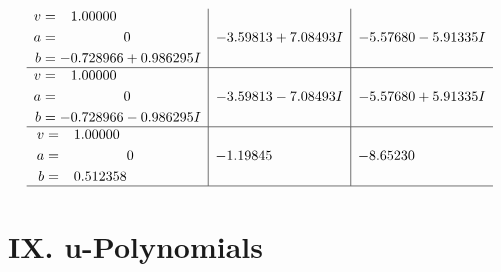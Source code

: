 \documentclass[1p]{elsarticle_modified}
\theoremstyle{definition}
\begin{document}
$$\begin{array}{c|c|c}
\begin{aligned}
v &= \phantom{-}1.00000\phantom{ +0.000000I} \\
a &= \phantom{-0.000000 } 0 \\
b &= -0.728966 + 0.986295 I\end{aligned}
 & -3.59813 + 7.08493 I & -5.57680 - 5.91335 I \\ \hline\begin{aligned}
v &= \phantom{-}1.00000\phantom{ +0.000000I} \\
a &= \phantom{-0.000000 } 0 \\
b &= -0.728966 - 0.986295 I\end{aligned}
 & -3.59813 - 7.08493 I & -5.57680 + 5.91335 I \\ \hline\begin{aligned}
v &= \phantom{-}1.00000\phantom{ +0.000000I} \\
a &= \phantom{-0.000000 } 0 \\
b &= \phantom{-}0.512358\phantom{ +0.000000I}\end{aligned}
 & -1.19845\phantom{ +0.000000I} & -8.65230\phantom{ +0.000000I}\\
 \hline 
 \end{array}$$\newpage
\newpage\renewcommand{\arraystretch}{1}
\centering \section*{ IX. u-Polynomials}
\end{document}
